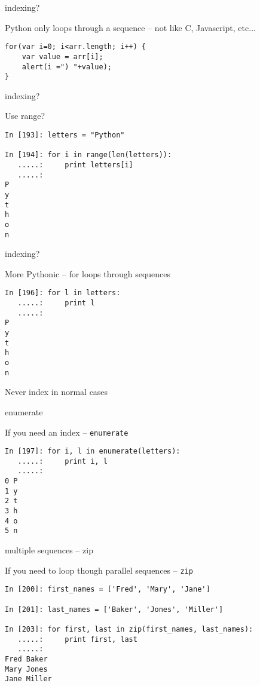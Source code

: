 \documentclass{beamer}
\begin{document}
\begin{frame}[fragile]{indexing?}

{\Large Python only loops through a sequence -- not like C, Javascript, etc...}
\begin{verbatim}
for(var i=0; i<arr.length; i++) {
    var value = arr[i];
    alert(i =") "+value);
}
\end{verbatim}

\end{frame}

\begin{frame}[fragile]{indexing?}

{\Large Use range?}
\begin{verbatim}
In [193]: letters = "Python"

In [194]: for i in range(len(letters)):
   .....:     print letters[i]
   .....:     
P
y
t
h
o
n
\end{verbatim}

\end{frame}

\begin{frame}[fragile]{indexing?}

{\Large More Pythonic -- for loops through sequences}
\begin{verbatim}
In [196]: for l in letters:
   .....:     print l
   .....:     
P
y
t
h
o
n
\end{verbatim}
\vfill
{\large Never index in normal cases}
\end{frame}

\begin{frame}[fragile]{enumerate}

{\Large If you need an index -- \verb|enumerate|}
\begin{verbatim}
In [197]: for i, l in enumerate(letters):
   .....:     print i, l
   .....:     
0 P
1 y
2 t
3 h
4 o
5 n
\end{verbatim}
\end{frame}

\begin{frame}[fragile]{multiple sequences -- zip}

{\Large If you need to loop though parallel sequences -- \verb|zip|}
\begin{verbatim}
In [200]: first_names = ['Fred', 'Mary', 'Jane']

In [201]: last_names = ['Baker', 'Jones', 'Miller']

In [203]: for first, last in zip(first_names, last_names):
   .....:     print first, last
   .....:     
Fred Baker
Mary Jones
Jane Miller
\end{verbatim}
\end{frame}
\end{document}
